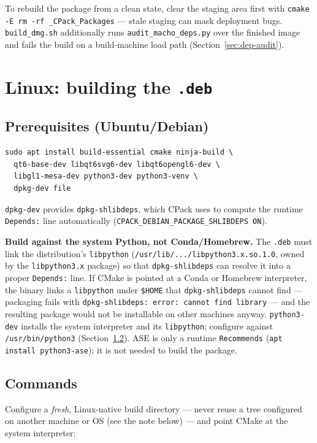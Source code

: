 \documentclass[11pt,a4paper]{article}
\newcommand{\file}[1]{\texttt{#1}}
\newcommand{\opt}[1]{\texttt{#1}}
\begin{document}
To rebuild the package from a clean state, clear the staging area first
with \lstinline|cmake -E rm -rf _CPack_Packages| --- stale staging can
mask deployment bugs. \file{build\_dmg.sh} additionally runs
\file{audit\_macho\_deps.py} over the finished image and fails the build
on a build-machine load path (Section~\ref{sec:dep-audit}).

\section{Linux: building the \file{.deb}}

\subsection{Prerequisites (Ubuntu/Debian)}

\begin{lstlisting}
sudo apt install build-essential cmake ninja-build \
  qt6-base-dev libqt6svg6-dev libqt6opengl6-dev \
  libgl1-mesa-dev python3-dev python3-venv \
  dpkg-dev file
\end{lstlisting}

\opt{dpkg-dev} provides \file{dpkg-shlibdeps}, which CPack uses to
compute the runtime \texttt{Depends:} line automatically
(\opt{CPACK\_DEBIAN\_PACKAGE\_SHLIBDEPS ON}).

\medskip
\noindent\textbf{Build against the system Python, not Conda/Homebrew.}
The \file{.deb} must link the distribution's \file{libpython}
(\file{/usr/lib/.../libpython3.x.so.1.0}, owned by the
\opt{libpython3.x} package) so that \file{dpkg-shlibdeps} can resolve it
into a proper \texttt{Depends:} line. If CMake is pointed at a Conda or
Homebrew interpreter, the binary links a \file{libpython} under
\file{\$HOME} that \file{dpkg-shlibdeps} cannot find --- packaging fails
with \texttt{dpkg-shlibdeps: error: cannot find library} --- and the
resulting package would not be installable on other machines anyway.
\file{python3-dev} installs the system interpreter and its
\file{libpython}; configure against \file{/usr/bin/python3}
(Section~\ref{sec:deb-commands}). ASE is only a runtime
\texttt{Recommends} (\texttt{apt install python3-ase}); it is not needed
to build the package.

\subsection{Commands}
\label{sec:deb-commands}

Configure a \emph{fresh}, Linux-native build directory --- never reuse a
tree configured on another machine or OS (see the note below) --- and
point CMake at the system interpreter:
\end{document}
